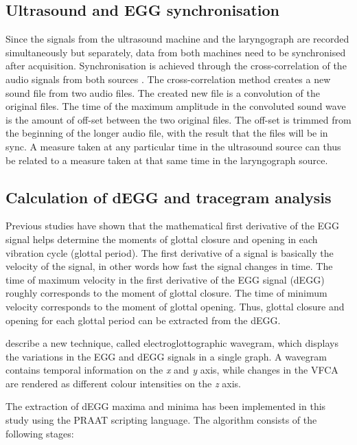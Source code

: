 \documentclass[11pt,A4paper,]{article}
\begin{document}
\subsection{Ultrasound and EGG
synchronisation}\label{ultrasound-and-egg-synchronisation}

Since the signals from the ultrasound machine and the laryngograph are
recorded simultaneously but separately, data from both machines need to
be synchronised after acquisition. Synchronisation is achieved through
the cross-correlation of the audio signals from both sources
\citep{grimaldi2008}. The cross-correlation method creates a new sound
file from two audio files. The created new file is a convolution of the
original files. The time of the maximum amplitude in the convoluted
sound wave is the amount of off-set between the two original files. The
off-set is trimmed from the beginning of the longer audio file, with the
result that the files will be in sync. A measure taken at any particular
time in the ultrasound source can thus be related to a measure taken at
that same time in the laryngograph source.

\subsection{Calculation of dEGG and tracegram
analysis}\label{s:tracegram}

Previous studies have shown that the mathematical first derivative of
the EGG signal helps determine the moments of glottal closure and
opening in each vibration cycle (glottal period). The first derivative
of a signal is basically the velocity of the signal, in other words how
fast the signal changes in time. The time of maximum velocity in the
first derivative of the EGG signal (dEGG) roughly corresponds to the
moment of glottal closure. The time of minimum velocity corresponds to
the moment of glottal opening. Thus, glottal closure and opening for
each glottal period can be extracted from the dEGG.

\citet{herbst2010} describe a new technique, called electroglottographic
wavegram, which displays the variations in the EGG and dEGG signals in a
single graph. A wavegram contains temporal information on the \emph{x}
and \emph{y} axis, while changes in the VFCA are rendered as different
colour intensities on the \emph{z} axis.

The extraction of dEGG maxima and minima has been implemented in this
study using the PRAAT scripting language. The algorithm consists of the
following stages:
\end{document}
